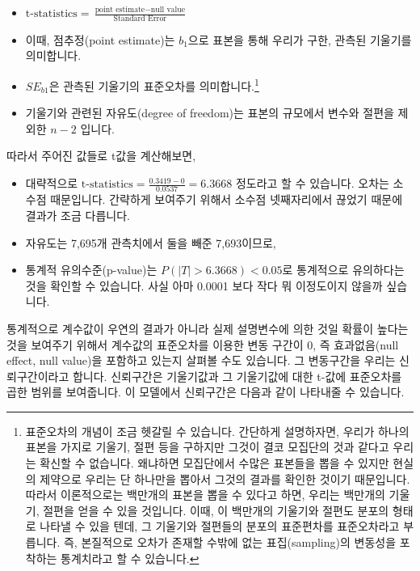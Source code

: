 \documentclass[]{book}
\let\rmarkdownfootnote\footnote%
\def\footnote{\protect\rmarkdownfootnote}
\begin{document}
\begin{itemize}
\begin{itemize}
    \begin{itemize}
    \item
      \(\text{t-statistics} = \frac{\text{point estimate} - \text{null value}}{\text{Standard Error}}\)
    \item
      이때, 점추정(point estimate)는 \(b_1\)으로 표본을 통해 우리가 구한, 관측된 기울기를 의미합니다.
    \item
      \(SE_{b1}\)은 관측된 기울기의 표준오차를 의미합니다.\footnote{표준오차의 개념이 조금 헷갈릴 수 있습니다. 간단하게 설명하자면, 우리가 하나의 표본을 가지로 기울기, 절편 등을 구하지만 그것이 결코 모집단의 것과 같다고 우리는 확신할 수 없습니다. 왜냐하면 모집단에서 수많은 표본들을 뽑을 수 있지만 현실의 제약으로 우리는 단 하나만을 뽑아서 그것의 결과를 확인한 것이기 때문입니다. 따라서 이론적으로는 백만개의 표본을 뽑을 수 있다고 하면, 우리는 백만개의 기울기, 절편을 얻을 수 있을 것입니다. 이때, 이 백만개의 기울기와 절편도 분포의 형태로 나타낼 수 있을 텐데, 그 기울기와 절편들의 분포의 표준편차를 표준오차라고 부릅니다. 즉, 본질적으로 오차가 존재할 수밖에 없는 표집(sampling)의 변동성을 포착하는 통계치라고 할 수 있습니다.}
    \item
      기울기와 관련된 자유도(degree of freedom)는 표본의 규모에서 변수와 절편을 제외한 \(n-2\) 입니다.
    \end{itemize}
  \end{itemize}
\end{itemize}

따라서 주어진 값들로 t값을 계산해보면,

\begin{itemize}
\item
  대략적으로 \(\text{t-statistics} = \frac{0.3419 - 0}{0.0537} = 6.3668\) 정도라고 할 수 있습니다. 오차는 소수점 때문입니다. 간략하게 보여주기 위해서 소수점 넷째자리에서 끊었기 때문에 결과가 조금 다릅니다.
\item
  자유도는 7,695개 관측치에서 둘을 빼준 7,693이므로,
\item
  통계적 유의수준(p-value)는 \(P(|T| > 6.3668) < 0.05\)로 통계적으로 유의하다는 것을 확인할 수 있습니다. 사실 아마 0.0001 보다 작다 뭐 이정도이지 않을까 싶습니다.
\end{itemize}

통계적으로 계수값이 우연의 결과가 아니라 실제 설명변수에 의한 것일 확률이 높다는 것을 보여주기 위해서 계수값의 표준오차를 이용한 변동 구간이 0, 즉 효과없음(null effect, null value)을 포함하고 있는지 살펴볼 수도 있습니다. 그 변동구간을 우리는 신뢰구간이라고 합니다. 신뢰구간은 기울기값과 그 기울기값에 대한 t-값에 표준오차를 곱한 범위를 보여줍니다. 이 모델에서 신뢰구간은 다음과 같이 나타내줄 수 있습니다.
\end{document}
